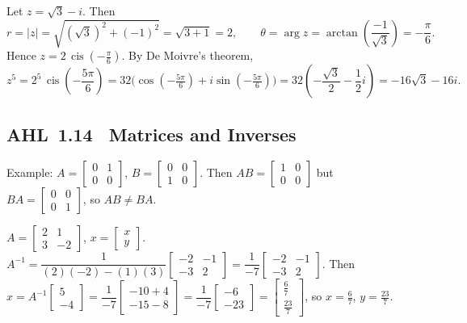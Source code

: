 \documentclass[11pt]{article}
\def\mathbf#1{#1}%
\newcommand{\tocsubsection}[1]{\subsection{#1}}
\begin{document}
\begin{solution}
Let \(z=\sqrt{3}-i\). Then
\[
r=\lvert z\rvert=\sqrt{(\sqrt{3})^{2}+(-1)^{2}}=\sqrt{3+1}=2,
\qquad
\theta=\arg z=\arctan\!\left(\frac{-1}{\sqrt{3}}\right)=-\frac{\pi}{6}.
\]
Hence \(z=2\,\operatorname{cis}\!\left(-\frac{\pi}{6}\right)\). By De Moivre’s theorem,
\[
z^{5}=2^{5}\,\operatorname{cis}\!\left(-\frac{5\pi}{6}\right)
=32\bigl(\cos(-\tfrac{5\pi}{6})+i\sin(-\tfrac{5\pi}{6})\bigr)
=32\!\left(-\frac{\sqrt{3}}{2}-\frac{1}{2}i\right)
= -16\sqrt{3}-16i.
\]
\end{solution}

\tocsubsection{AHL 1.14 \; Matrices and Inverses}


\begin{solution}
Example: $A=\begin{bmatrix}0&1\\0&0\end{bmatrix}$, $B=\begin{bmatrix}0&0\\1&0\end{bmatrix}$.
Then $AB=\begin{bmatrix}1&0\\0&0\end{bmatrix}$ but $BA=\begin{bmatrix}0&0\\0&1\end{bmatrix}$, so $AB\ne BA$.
\end{solution}


\begin{solution}
$A=\begin{bmatrix}2&1\\3&-2\end{bmatrix}$, $\mathbf{x}=\begin{bmatrix}x\\y\end{bmatrix}$.
$A^{-1}=\dfrac{1}{(2)(-2)-(1)(3)}\begin{bmatrix}-2&-1\\-3&2\end{bmatrix}=\dfrac{1}{-7}\begin{bmatrix}-2&-1\\-3&2\end{bmatrix}$.
Then $\mathbf{x}=A^{-1}\begin{bmatrix}5\\-4\end{bmatrix}=\dfrac{1}{-7}\begin{bmatrix}-10+4\\-15-8\end{bmatrix}=\dfrac{1}{-7}\begin{bmatrix}-6\\-23\end{bmatrix}=\begin{bmatrix}\tfrac{6}{7}\\\tfrac{23}{7}\end{bmatrix}$,
so $x=\tfrac{6}{7}$, $y=\tfrac{23}{7}$.
\end{solution}
\end{document}
